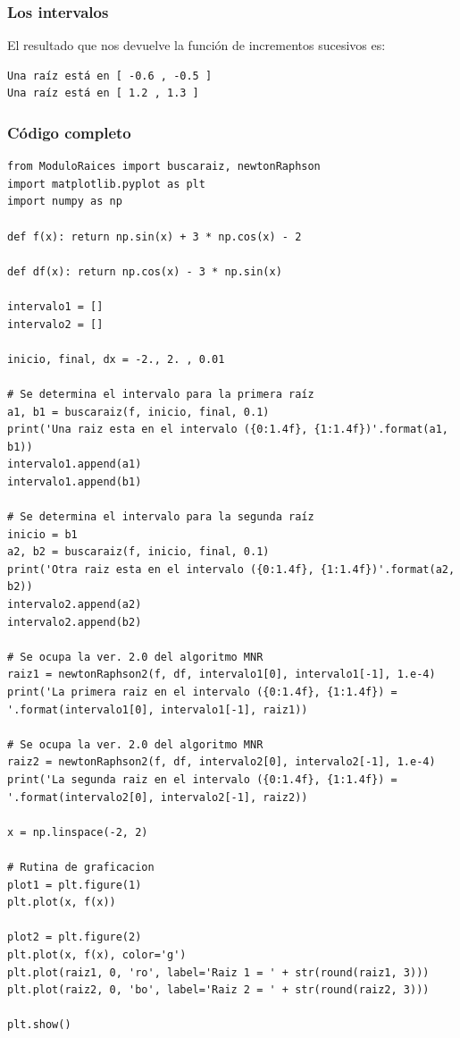 \documentclass[12pt]{beamer}
\begin{document}
\begin{frame}[fragile]
\frametitle{Los intervalos}
El resultado que nos devuelve la función de incrementos sucesivos es:
\pause
\begin{verbatim}
Una raíz está en [ -0.6 , -0.5 ]
Una raíz está en [ 1.2 , 1.3 ]
\end{verbatim}
\end{frame}
\begin{frame}
\frametitle{Código completo}
\begin{lstlisting}[caption=Código completo para el ejercicio 1]
from ModuloRaices import buscaraiz, newtonRaphson
import matplotlib.pyplot as plt
import numpy as np

def f(x): return np.sin(x) + 3 * np.cos(x) - 2

def df(x): return np.cos(x) - 3 * np.sin(x)

intervalo1 = []
intervalo2 = []

inicio, final, dx = -2., 2. , 0.01

# Se determina el intervalo para la primera raíz
a1, b1 = buscaraiz(f, inicio, final, 0.1)
print('Una raiz esta en el intervalo ({0:1.4f}, {1:1.4f})'.format(a1, b1))
intervalo1.append(a1)
intervalo1.append(b1)

# Se determina el intervalo para la segunda raíz
inicio = b1
a2, b2 = buscaraiz(f, inicio, final, 0.1)
print('Otra raiz esta en el intervalo ({0:1.4f}, {1:1.4f})'.format(a2, b2))
intervalo2.append(a2)
intervalo2.append(b2)

# Se ocupa la ver. 2.0 del algoritmo MNR
raiz1 = newtonRaphson2(f, df, intervalo1[0], intervalo1[-1], 1.e-4)
print('La primera raiz en el intervalo ({0:1.4f}, {1:1.4f}) = '.format(intervalo1[0], intervalo1[-1], raiz1))

# Se ocupa la ver. 2.0 del algoritmo MNR
raiz2 = newtonRaphson2(f, df, intervalo2[0], intervalo2[-1], 1.e-4)
print('La segunda raiz en el intervalo ({0:1.4f}, {1:1.4f}) = '.format(intervalo2[0], intervalo2[-1], raiz2))

x = np.linspace(-2, 2)

# Rutina de graficacion
plot1 = plt.figure(1)
plt.plot(x, f(x))

plot2 = plt.figure(2)
plt.plot(x, f(x), color='g')
plt.plot(raiz1, 0, 'ro', label='Raiz 1 = ' + str(round(raiz1, 3)))
plt.plot(raiz2, 0, 'bo', label='Raiz 2 = ' + str(round(raiz2, 3)))

plt.show()
\end{lstlisting}    
\end{frame}
\end{document}
